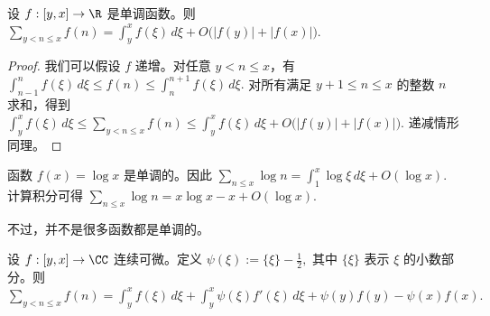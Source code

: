 \begin{theorem}
	设 $f:[y,x]\to\R$ 是单调函数。则
	\(\textstyle \sum_{y<n\leq\allowbreak{} x} f(n) =\allowbreak{} \int_y^x f(\xi)\,d\xi +\allowbreak{} O\bigl(|f(y)|+\allowbreak{}|f(x)|\bigr).\)
\end{theorem}

\begin{proof}
	我们可以假设 $f$ 递增。对任意 $y<n\leq x$，有
	\(\textstyle \int_{n-1}^{n} f(\xi)\,d\xi \leq\allowbreak{} f(n) \leq\allowbreak{} \int_{n}^{n+\allowbreak{}1} f(\xi)\,d\xi.\)
	对所有满足 $y+1\leq n\leq x$ 的整数 $n$ 求和，得到
	\(\textstyle \int_y^x f(\xi)\,d\xi \leq\allowbreak{} \sum_{y<n\leq\allowbreak{} x} f(n) \leq\allowbreak{} \int_y^x f(\xi)\,d\xi+\allowbreak{}O\bigl(|f(y)|+\allowbreak{}|f(x)|\bigr).\)
	递减情形同理。
\end{proof}

\begin{example}
	函数 $f(x)=\log x$ 是单调的。因此
	\(\textstyle \sum_{n\leq\allowbreak{} x}\log n =\allowbreak{} \int_1^x\log \xi\,d\xi+\allowbreak{}O(\log x).\)
	计算积分可得
	\(\textstyle \sum_{n\leq\allowbreak{} x}\log n =\allowbreak{} x\log x-x+\allowbreak{}O(\log x).\)
\end{example}

不过，并不是很多函数都是单调的。

\begin{theorem}
	设 $f:[y,x]\to\CC$ 连续可微。定义
	\(\textstyle \psi(\xi):=\allowbreak{}\{\xi\}-\frac12,\allowbreak{}\)
	其中 $\{\xi\}$ 表示 $\xi$ 的小数部分。则
	\(\textstyle \sum_{y<n\leq\allowbreak{} x} f(n) =\allowbreak{} \int_y^x f(\xi)\,d\xi +\allowbreak{} \int_y^x \psi(\xi)f'(\xi)\,d\xi +\allowbreak{} \psi(y)f(y)-\psi(x)f(x).\)
\end{theorem}

